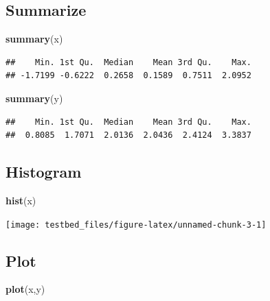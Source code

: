 \documentclass[]{article}
\newenvironment{Shaded}{\begin{snugshade}}{\end{snugshade}}
\newcommand{\KeywordTok}[1]{\textcolor[rgb]{0.13,0.29,0.53}{\textbf{#1}}}
\newcommand{\NormalTok}[1]{#1}
\begin{document}
\hypertarget{summarize}{%
\subsection{Summarize}\label{summarize}}

\begin{Shaded}
\begin{Highlighting}[]
\KeywordTok{summary}\NormalTok{(x)}
\end{Highlighting}
\end{Shaded}

\begin{verbatim}
##    Min. 1st Qu.  Median    Mean 3rd Qu.    Max. 
## -1.7199 -0.6222  0.2658  0.1589  0.7511  2.0952
\end{verbatim}

\begin{Shaded}
\begin{Highlighting}[]
\KeywordTok{summary}\NormalTok{(y)}
\end{Highlighting}
\end{Shaded}

\begin{verbatim}
##    Min. 1st Qu.  Median    Mean 3rd Qu.    Max. 
##  0.8085  1.7071  2.0136  2.0436  2.4124  3.3837
\end{verbatim}

\hypertarget{histogram}{%
\subsection{Histogram}\label{histogram}}

\begin{Shaded}
\begin{Highlighting}[]
\KeywordTok{hist}\NormalTok{(x)}
\end{Highlighting}
\end{Shaded}

\begin{center}\texttt{[image: testbed\_files/figure-latex/unnamed-chunk-3-1]} \end{center}

\hypertarget{plot}{%
\subsection{Plot}\label{plot}}

\begin{Shaded}
\begin{Highlighting}[]
\KeywordTok{plot}\NormalTok{(x,y)}
\end{Highlighting}
\end{Shaded}
\end{document}
